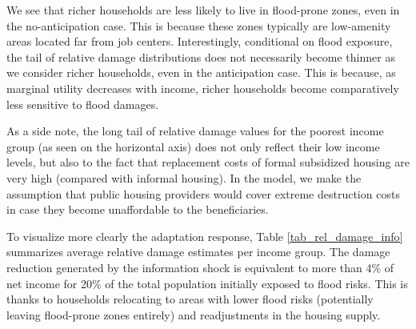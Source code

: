 \documentclass[12pt]{article}
\begin{document}
We see that richer households are less likely to live in flood-prone zones, even in the no-anticipation case. This is because these zones typically are low-amenity areas located far from job centers. Interestingly, conditional on flood exposure, the tail of relative damage distributions does not necessarily become thinner as we consider richer households, even in the anticipation case. This is because, as marginal utility decreases with income, richer households become comparatively less sensitive to flood damages.

As a side note, the long tail of relative damage values for the poorest income group (as seen on the horizontal axis) does not only reflect their low income levels, but also to the fact that replacement costs of formal subsidized housing are very high (compared with informal housing). In the model, we make the assumption that public housing providers would cover extreme destruction costs in case they become unaffordable to the beneficiaries.


To visualize more clearly the adaptation response, Table \ref{tab_rel_damage_info} summarizes average relative damage estimates per income group. The damage reduction generated by the information shock is equivalent to more than 4\% of net income for 20\% of the total population initially exposed to flood risks. This is thanks to households relocating to areas with lower flood risks (potentially leaving flood-prone zones entirely) and readjustments in the housing supply.

\end{document}
